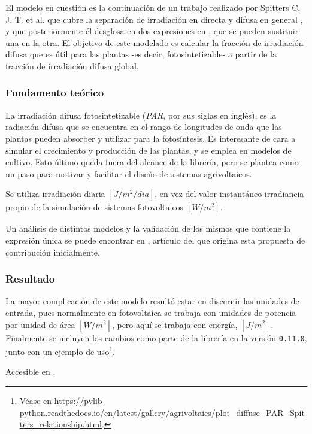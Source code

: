 El modelo en cuestión es la continuación de un trabajo realizado por Spitters C. J. T. et al. que cubre la separación de irradiación en directa y difusa en general \cite{Spitters_Toussaint_Goudriaan_1986}, y que posteriormente él desglosa en dos expresiones en \cite{Spitters_1986}, que se pueden sustituir una en la otra. El objetivo de este modelado es calcular la fracción de irradiación difusa que es útil para las plantas -es decir, fotosintetizable- a partir de la fracción de irradiación difusa global.

\subsubsection{Fundamento teórico}

La irradiación difusa fotosintetizable (\textit{PAR}, por sus siglas en inglés), es la radiación difusa que se encuentra en el rango de longitudes de onda que las plantas pueden absorber y utilizar para la fotosíntesis. Es interesante de cara a simular el crecimiento y producción de las plantas, y se emplea en modelos de cultivo. Esto último queda fuera del alcance de la librería, pero se plantea como un paso para motivar y facilitar el diseño de sistemas agrivoltaicos.

Se utiliza irradiación diaria $[J/m^2/dia]$, en vez del valor instantáneo irradiancia propio de la simulación de sistemas fotovoltaicos $[W/m^2]$.

Un análisis de distintos modelos y la validación de los mismos que contiene la expresión única se puede encontrar en \cite{Ma_Lu_Zainali_Stridh_Avelin_Amaducci_Colauzzi_Campana_2022}, artículo del que origina esta propuesta de contribución inicialmente.

\subsubsection{Resultado}

La mayor complicación de este modelo resultó estar en discernir las unidades de entrada, pues normalmente en fotovoltaica se trabaja con unidades de potencia por unidad de área $\left[W/m^2\right]$, pero aquí se trabaja con energía, $\left[J/m^2\right]$. Finalmente se incluyen los cambios como parte de la librería en la versión \texttt{0.11.0}, junto con un ejemplo de uso\footnote{Véase en \url{https://pvlib-python.readthedocs.io/en/latest/gallery/agrivoltaics/plot_diffuse_PAR_Spitters_relationship.html}.}.

Accesible en .

